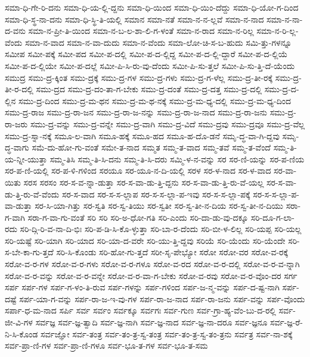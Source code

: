 {ಸಮಾ-ಧಿ-ಗೇ-ರಿ-ದನು
ಸಮಾ-ಧಿ-ಯ-ಲ್ಲಿ-ದ್ದನು
ಸಮಾ-ಧಿ-ಯಿಂದ
ಸಮಾ-ಧಿ-ಯಿಂ-ದೆದ್ದು
ಸಮಾ-ಧಿ-ಯೋ-ಗ-ದಿಂದ
ಸಮಾ-ಧಿ-ಸ್ಥ-ನಾ-ದನು
ಸಮಾ-ಧಿ-ಸ್ಥಿ-ತಿ-ಯಲ್ಲಿ
ಸಮಾನ
ಸಮಾ-ನತೆ
ಸಮಾ-ನ-ನ-ಲ್ಲವೆ
ಸಮಾ-ನ-ನಾದ
ಸಮಾ-ನ-ನಾ-ದ-ವನು
ಸಮಾ-ನ-ಪ್ರೀ-ತಿ-ಯಿಂದ
ಸಮಾ-ನ-ಬ-ಲ-ಶಾ-ಲಿ-ಗ-ಳಂತೆ
ಸಮಾ-ನ-ರಾದ
ಸಮಾ-ನ-ರಿಲ್ಲ
ಸಮಾ-ನ-ರಿ-ಲ್ಲ-ವೆಂದು
ಸಮಾ-ನ-ವಾದ
ಸಮಾ-ನ-ವಾ-ದುದು
ಸಮಾ-ನ-ವೆಂದು
ಸಮಾ-ಲೋ-ಚಿ-ಸ-ಬ-ಹುದು
ಸಮಿ-ತ್ತು-ಗಳನ್ನೂ
ಸಮೀಪ
ಸಮೀ-ಪಕ್ಕೆ
ಸಮೀ-ಪದ
ಸಮೀ-ಪ-ದಲ್ಲಿ
ಸಮೀ-ಪ-ದ-ಲ್ಲಿದ್ದ
ಸಮೀ-ಪ-ದ-ಲ್ಲಿ-ದ್ದಾರೆ
ಸಮೀ-ಪ-ದ-ಲ್ಲಿಯೆ
ಸಮೀ-ಪ-ದ-ಲ್ಲಿಯೇ
ಸಮೀ-ಪ-ದಲ್ಲೆ
ಸಮೀ-ಪಿ-ಸಿ-ರು-ವು-ದೆಂದು
ಸಮೀ-ಪಿ-ಸು-ತ್ತಲೆ
ಸಮೀ-ಪಿ-ಸು-ತ್ತಿ-ದೆ-ಯೆಂದು
ಸಮುದ್ರ
ಸಮು-ದ್ರ-ಕ್ಕಿಂತ
ಸಮು-ದ್ರಕ್ಕೆ
ಸಮು-ದ್ರ-ಗಳ
ಸಮು-ದ್ರ-ಗಳು
ಸಮು-ದ್ರ-ಗ-ಳೆಲ್ಲ
ಸಮು-ದ್ರ-ತೀ-ರಕ್ಕೆ
ಸಮು-ದ್ರ-ತೀ-ರ-ದಲ್ಲಿ
ಸಮು-ದ್ರದ
ಸಮು-ದ್ರ-ದಂ-ತಾ-ಗ-ಬೇಕು
ಸಮು-ದ್ರ-ದಂತೆ
ಸಮು-ದ್ರ-ದತ್ತ
ಸಮು-ದ್ರ-ದಲ್ಲಿ
ಸಮು-ದ್ರ-ದ-ಲ್ಲಿನ
ಸಮು-ದ್ರ-ದಿಂದ
ಸಮು-ದ್ರ-ಮ-ಥನ
ಸಮು-ದ್ರ-ಮ-ಥ-ನಕ್ಕೆ
ಸಮು-ದ್ರ-ಮ-ಧ್ಯ-ದಲ್ಲಿ
ಸಮು-ದ್ರ-ಮ-ಧ್ಯ-ದಿಂದ
ಸಮು-ದ್ರ-ರಾಜ
ಸಮು-ದ್ರ-ರಾ-ಜನ
ಸಮು-ದ್ರ-ರಾ-ಜ-ನನ್ನು
ಸಮು-ದ್ರ-ರಾ-ಜ-ನಾದ
ಸಮು-ದ್ರ-ರಾ-ಜನು
ಸಮು-ದ್ರ-ರಾ-ಜರು
ಸಮು-ದ್ರ-ವನ್ನು
ಸಮು-ದ್ರ-ವನ್ನೇ
ಸಮು-ದ್ರ-ವಾಗಿ
ಸಮು-ದ್ರ-ವಿದೆ
ಸಮು-ದ್ರವು
ಸಮು-ದ್ರವೂ
ಸಮು-ದ್ರ-ವೆಲ್ಲ
ಸಮು-ದ್ರ-ಸ್ನಾ-ನಕ್ಕೆ
ಸಮೂ-ಲ-ವಾಗಿ
ಸಮೂ-ಹಕ್ಕೆ
ಸಮೂ-ಹದ
ಸಮೂ-ಹ-ದೊ-ಡನೆ
ಸಮೃ-ದ್ಧ-ವಾ-ಗಿ-ದ್ದವು
ಸಮೃ-ದ್ಧ-ವಾಗು
ಸಮೆ-ದು-ಹೋ-ಗು-ವಂತೆ
ಸಮೇ-ತ-ನಾದ
ಸಮ್ಮತ
ಸಮ್ಮ-ತ-ವಾದ
ಸಮ್ಮ-ತವೆ
ಸಮ್ಮ-ತ-ವೆಂದೆ
ಸಮ್ಮ-ತಿ-ಯ-ನ್ನೀ-ಯುತ್ತಾ
ಸಮ್ಮ-ತಿಸಿ
ಸಮ್ಮ-ತಿ-ಸಿ-ದನು
ಸಮ್ಮ-ತಿ-ಸಿ-ದರು
ಸಮ್ಮಿ-ಳ-ನ-ವನ್ನು
ಸರ
ಸರ-ಣಿ-ಯನ್ನು
ಸರ-ಪ-ಣಿಯ
ಸರ-ಪ-ಣಿ-ಯಲ್ಲಿ
ಸರ-ಪ-ಳಿ-ಗಳಿಂದ
ಸರಯೂ
ಸರ-ಯೂ-ನ-ದಿ-ಯಲ್ಲಿ
ಸರಳ
ಸರ-ಳ-ನಾದ
ಸರ-ಳ-ವಾದ
ಸರ-ವಾ-ಯಿತು
ಸರಸ
ಸರಸಂ
ಸರ-ಸ-ವ-ನ್ನಾ-ಡುತ್ತಾ
ಸರ-ಸ-ವಾ-ಡು-ತ್ತಿ-ದ್ದನು
ಸರ-ಸ-ವಾ-ಡು-ತ್ತಿ-ರು-ವೆ-ಯಲ್ಲ
ಸರ-ಸ-ವಾ-ಡು-ತ್ತಿ-ರು-ವೆ-ವೆಂದು
ಸರ-ಸ-ವಾದ
ಸರ-ಸ-ಸ-ಲ್ಲಾಪ
ಸರ-ಸ-ಸ-ಲ್ಲಾ-ಪ-ಇವು
ಸರ-ಸ-ಸ-ಲ್ಲಾ-ಪಕ್ಕೆ
ಸರ-ಸ-ಸ-ಲ್ಲಾ-ಪ-ವಾ-ಡುತ್ತಾ
ಸರ-ಸಿ-ಯಾ-ಗಿತ್ತು
ಸರ-ಸ್ವತಿ
ಸರ-ಸ್ವ-ತಿಯು
ಸರ-ಸ್ವತೀ
ಸರ-ಸ್ವ-ತೀ-ನ-ದಿಯ
ಸರ-ಸ್ವ-ತೀ-ನ-ದಿಯು
ಸರಾ-ಗ-ವಾಗಿ
ಸರಾ-ಗ-ವಾ-ಗು-ವಂತೆ
ಸರಿ
ಸರಿ
ಸರಿ-ಅ-ಧೋ-ಗತಿ
ಸರಿ-ಎಂದು
ಸರಿ-ದಾ-ಡು-ವು-ದಕ್ಕೂ
ಸರಿ-ದೂ-ಗ-ಲಾ-ರದು
ಸರಿ-ದ್ಗಿ-ರಿ-ವ-ನಾ-ದಿ-ಭಿಃ
ಸರಿ-ಪ-ಡಿ-ಸಿ-ಕೊ-ಳ್ಳುತ್ತಾ
ಸರಿ-ಬಾ-ರ-ದೆಂದು
ಸರಿ-ಬೀ-ಳ-ಲಿಲ್ಲ
ಸರಿ-ಯಪ್ಪ
ಸರಿ-ಯಲ್ಲ
ಸರಿ-ಯಷ್ಟೆ
ಸರಿ-ಯಾಗಿ
ಸರಿ-ಯಾದ
ಸರಿ-ಯಾ-ದ-ವರೇ
ಸರಿ-ಯು-ತ್ತಿ-ದ್ದವು
ಸರಿಯೆ
ಸರಿ-ಯೆಂದು
ಸರಿ-ಯೆಂದೇ
ಸರಿ-ಸ-ಬೇ-ಕಾ-ಗು-ತ್ತದೆ
ಸರಿ-ಸಿ-ಕೊಂಡು
ಸರಿ-ಹೋ-ಗು-ತ್ತದೆ
ಸರೀ-ಸೃ-ಪೇಭ್ಯೋ
ಸರೋ
ಸರೋ-ವರ
ಸರೋ-ವ-ರಕ್ಕೆ
ಸರೋ-ವ-ರ-ಗಳ
ಸರೋ-ವ-ರ-ಗಳು
ಸರೋ-ವ-ರ-ಗಳೂ
ಸರೋ-ವ-ರದ
ಸರೋ-ವ-ರ-ದಲ್ಲಿ
ಸರೋ-ವ-ರ-ವ-ನ್ನಾಗಿ
ಸರೋ-ವ-ರ-ವನ್ನು
ಸರೋ-ವ-ರ-ವನ್ನೇ
ಸರೋ-ವ-ರ-ವಾ-ಗ-ಬೇಕು
ಸರೋ-ವ-ರವು
ಸರೋ-ವ-ರ-ವೊಂ-ದರ
ಸರ್ಗ
ಸರ್ಪ
ಸರ್ಪ-ಗಳ
ಸರ್ಪ-ಗ-ಳಂ-ತಿ-ರುವ
ಸರ್ಪ-ಗಳನ್ನು
ಸರ್ಪ-ಗಳಿಂದ
ಸರ್ಪ-ಜ-ನ್ಮ-ವನ್ನು
ಸರ್ಪ-ದ-ಷ್ಟ-ನಾಗಿ
ಸರ್ಪ-ದಷ್ಟೆ
ಸರ್ಪ-ಯಾ-ಗ-ವನ್ನು
ಸರ್ಪ-ರಾ-ಜ-ಇ-ವು-ಗಳ
ಸರ್ಪ-ರಾ-ಜ-ನಾದ
ಸರ್ಪ-ರಾ-ಜನು
ಸರ್ಪ-ವನ್ನು
ಸರ್ಪ-ವೊಂದು
ಸರ್ಪಾ-ಧ-ಮ-ನಾದ
ಸರ್ಪಿ
ಸರ್ವ
ಸರ್ವಂ
ಸರ್ವಕ್ಕೂ
ಸರ್ವಗಃ
ಸರ್ವ-ಗುಣ
ಸರ್ವ-ಗ್ರಾ-ಹ್ಯ-ವೆಂ-ಬು-ದ-ರಲ್ಲಿ
ಸರ್ವ-ಜೀ-ವಿ-ಗಳ
ಸರ್ವಜ್ಞ
ಸರ್ವ-ಜ್ಞ-ತ್ವಾದಿ
ಸರ್ವ-ಜ್ಞ-ನಾಗಿ
ಸರ್ವ-ಜ್ಞ-ನಾದ
ಸರ್ವ-ಜ್ಞ-ನಾ-ದರೂ
ಸರ್ವ-ಜ್ಞನೂ
ಸರ್ವ-ಜ್ಞ-ರೆ-ನಿ-ಸಿ-ಕೊಂಡ
ಸರ್ವಜ್ಞೋ
ಸರ್ವ-ತಂತ್ರ
ಸರ್ವ-ತಂ-ತ್ರ-ಸ್ವ-ತಂತ್ರ
ಸರ್ವ-ತಂ-ತ್ರ-ಸ್ವ-ತಂ-ತ್ರನು
ಸರ್ವತ್ರ
ಸರ್ವ-ನಾ-ಶಕ್ಕೆ
ಸರ್ವ-ಪ್ರಾ-ಣಿ-ಗಳ
ಸರ್ವ-ಪ್ರಾ-ಣಿ-ಗಳೂ
ಸರ್ವ-ಭೂ-ತ-ಗಳ
ಸರ್ವ-ಭೂ-ತ-ಸಮ
}
